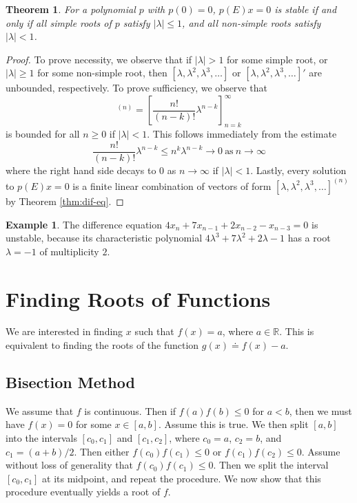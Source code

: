 \documentclass[12pt]{article}
\newcommand{\rr}{\mathbb{R}}
\theoremstyle{plain}
\newtheorem{theorem}{Theorem}
\theoremstyle{definition}
\newtheorem*{example}{Example}
\theoremstyle{remark}
\numberwithin{equation}{section}  %
\begin{document}
\begin{theorem}
	For a polynomial $p$ with $p(0) = 0$, $p(E)x = 0$ is stable if and only if
	all simple roots of $p$ satisfy $|\lambda| \le 1$, and all non-simple roots
	satisfy $|\lambda| < 1$. 
\end{theorem}
\begin{proof}
	To prove necessity, we observe that if $|\lambda| > 1$ for some simple root, or
	$|\lambda| \ge 1$ for some non-simple root, then $[\lambda, \lambda^2, \lambda^3,
	\ldots]$ or $[\lambda, \lambda^2, \lambda^3, \ldots]'$ are unbounded, respectively.
	To prove sufficiency, we observe that
	\begin{equation*}
		[\lambda, \lambda^2, \lambda^3,
		\ldots]^{(n)} = \left [ \frac{n!}{(n - k)!} \lambda^{n - k} \right ]_{n =
		k}^{\infty} 
	\end{equation*}
	is bounded for all $n \ge 0$ if $|\lambda| < 1$. This follows immediately from
	the estimate 
	\begin{equation*}
		\frac{n!}{(n - k)!} \lambda^{n - k}  \le n^{k} \lambda^{n-k} \to 0 \ \text{as} \
		n \to \infty
	\end{equation*}
	where the right hand side decays to $0$ as $n \to \infty$ if $|\lambda| < 1$. Lastly,
	every  solution to $p(E)x = 0$ is a finite linear combination of vectors of form
	$[\lambda, \lambda^2, \lambda^3, \ldots]^{(n)}$ by Theorem \ref{thm:dif-eq}.
\end{proof}
\begin{example}
	The difference equation $4x_n + 7x_{n-1} + 2 x_{n-2} - x_{n-3} = 0$ is
	unstable, because its characteristic polynomial 
	$4\lambda^{3} + 7\lambda^{2} + 2 \lambda - 1$ has a root $\lambda= -1$  
	of multiplicity $2$.
\end{example}
\section{Finding Roots of Functions}
We are interested in finding $x$ such that
$f(x) = a$, where $a \in \rr$. This is equivalent to finding
the roots of the function $g(x) \doteq f(x) - a$.
\subsection{Bisection Method}
We assume that $f$ is continuous. Then if $f(a)f(b) \le 0$ for $a < b$,
then we must have $f(x) = 0$ for some $x \in [a,b]$. Assume this is true.
We then split
$[a,b]$ into the intervals $[c_0, c_1]$ and $[c_1, c_2]$, where $c_0 = a$, $c_2 = b$, and
$c_1 = (a + b)/2$. Then either $f(c_0)f(c_1) \le 0$ or $f(c_1)f(c_2) \le 0$.
Assume without loss of generality that $f(c_0)f(c_1) \le 0$. Then we
split the interval $[c_0, c_1]$ at its midpoint, and repeat the procedure. We
now show that this procedure eventually yields a root of $f$.  
\end{document}
